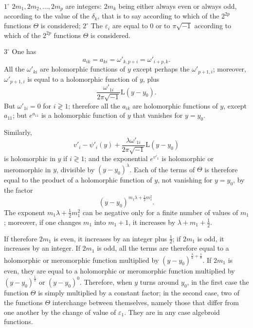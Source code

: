 \documentclass{article}
\begin{document}
$1^{\circ}$ $2m_{1}, 2m_{2}, \ldots, 2m_{p}$ are integers: $2m_{k}$ being either always even or always odd, according to the value of the $\delta_{k}$, that is to say according to which of the $2^{2p}$ functions $\Theta$ is considered;
$2^{\circ}$ The $\varepsilon_{i}$ are equal to $0$ or to $\pi\sqrt{-1}$ according to which of the $2^{2p}$ functions $\Theta$ is considered.

$3^{\circ}$ One has
\[
a_{ik} = a_{ki} = \omega'_{k, p+i} = \omega'_{i+p, k}.
\]
All the $\omega'_{ki}$ are holomorphic functions of $y$ except perhaps the $\omega'_{p+1, i}$; moreover, $\omega'_{p+1, i}$ is equal to a holomorphic function of $y$, plus
\[
\frac{\omega'_{1i}}{2\pi\sqrt{-1}}\mathrm{L}(y - y_{0}).
\]
But $\omega'_{1i} = 0$ for $i \gtrless 1$; therefore all the $a_{ik}$ are holomorphic functions of $y$, except $a_{11}$; but $e^{a_{11}}$ is a holomorphic function of $y$ that vanishes for $y = y_{0}$.

Similarly,
\[
v'_{i} - \psi'_{i}(y) + \frac{\lambda \omega'_{1i}}{2\pi\sqrt{-1}}\mathrm{L}(y - y_{0})
\]
is holomorphic in $y$ if $i \gtrless 1$; and the exponential $e^{v'_{1}}$ is holomorphic or meromorphic in $y$, divisible by $(y - y_{0})^{\lambda}$. Each of the terms of $\Theta$ is therefore equal to the product of a holomorphic function of $y$, not vanishing for $y = y_{0}$, by the factor
\[
(y - y_{0})^{m_{1}\lambda + \frac{1}{2}m_{1}^{2}}.
\]
The exponent $m_{1}\lambda + \frac{1}{2}m_{1}^{2}$ can be negative only for a finite number of values of $m_{1}$; moreover, if one changes $m_{1}$ into $m_{1} + 1$, it increases by $\lambda + m_{1} + \frac{1}{2}$.

If therefore $2m_{1}$ is even, it increases by an integer plus $\frac{1}{2}$; if $2m_{1}$ is odd, it increases by an integer. If $2m_{1}$ is odd, all the terms are therefore equal to a holomorphic or meromorphic function multiplied by $(y - y_{0})^{\frac{\lambda}{2} + \frac{1}{8}}$. If $2m_{1}$ is even, they are equal to a holomorphic or meromorphic function multiplied by $(y - y_{0})^{\frac{1}{2}}$ or $(y - y_{0})^{0}$. Therefore, when $y$ turns around $y_{0}$, in the first case the function $\Theta$ is simply multiplied by a constant factor; in the second case, two of the functions $\Theta$ interchange between themselves, namely those that differ from one another by the change of value of $\varepsilon_{1}$. They are in any case algebroid functions.
\end{document}
